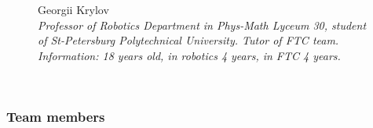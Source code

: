 \begin{figure}[H]
	\begin{minipage}{0.47\linewidth}
		Georgii Krylov \\ 
		\emph{Professor of Robotics Department in Phys-Math Lyceum 30, student of St-Petersburg Polytechnical University. Tutor of FTC team. \\}
		\emph{Information: 18 years old, in robotics 4 years, in FTC 4 years.}
	\end{minipage}	
	\hfill
	\begin{minipage}[h]{0.47\linewidth}
		\\
	\end{minipage}
	\vfill 
\end{figure}

\fillpage

\subsubsection{Team members}

